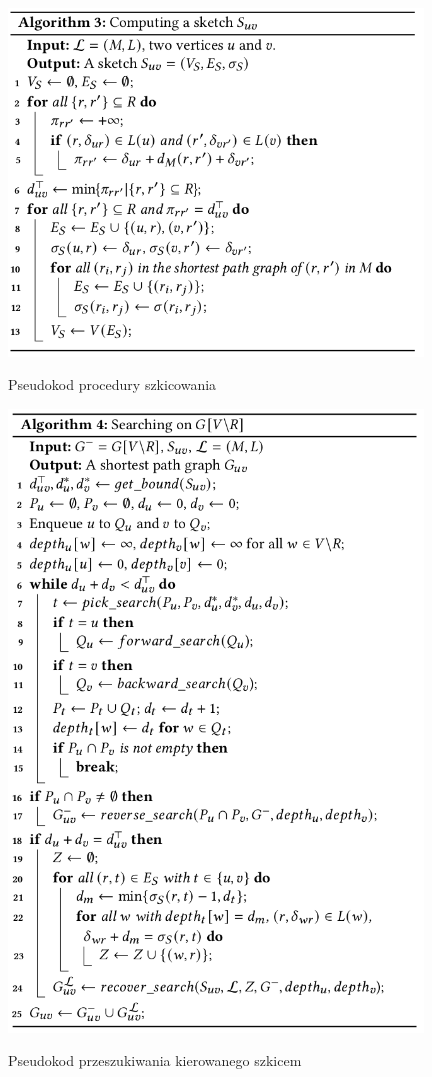 \documentclass{article}
\theoremstyle{definition}
\begin{document}
    \begin{figure}[!tbh]
        \includegraphics[width=11cm]{img/algorithm_3.png}
        \centering
        \label{fig:alg3}
        \caption{Pseudokod procedury szkicowania}
    \end{figure}


    \begin{figure}[!tbh]
        \includegraphics[width=11cm]{img/algorithm_4.png}
        \centering
        \label{fig:alg4}
        \caption{Pseudokod przeszukiwania kierowanego szkicem}
    \end{figure}
\end{document}
